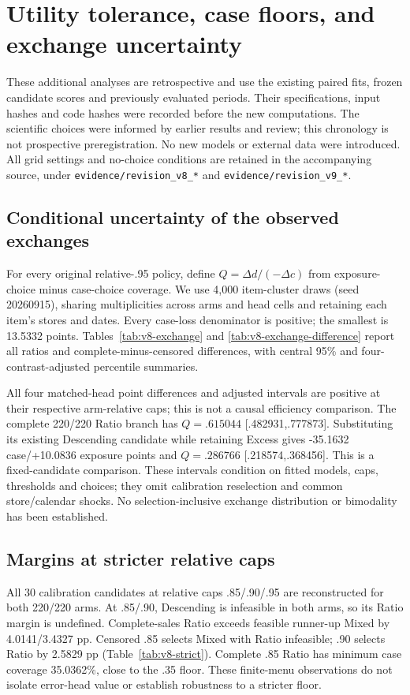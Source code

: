 \FloatBarrier
\section{Utility tolerance, case floors, and exchange uncertainty}
\label{app:v8}
These additional analyses are retrospective and use the existing paired fits, frozen candidate scores and previously evaluated periods. Their specifications, input hashes and code hashes were recorded before the new computations. The scientific choices were informed by earlier results and review; this chronology is not prospective preregistration. No new models or external data were introduced. All grid settings and no-choice conditions are retained in the accompanying source, under \texttt{evidence/revision\_v8\_*} and \texttt{evidence/revision\_v9\_*}.

\subsection{Conditional uncertainty of the observed exchanges}
\label{app:v8-exchange}
For every original relative-.95 policy, define $Q=\Delta d/(-\Delta c)$ from exposure-choice minus case-choice coverage. We use 4,000 item-cluster draws (seed 20260915), sharing multiplicities across arms and head cells and retaining each item's stores and dates. Every case-loss denominator is positive; the smallest is 13.5332 points. Tables~\ref{tab:v8-exchange} and \ref{tab:v8-exchange-difference} report all ratios and complete-minus-censored differences, with central 95\% and four-contrast-adjusted percentile summaries.


All four matched-head point differences and adjusted intervals are positive at their respective arm-relative caps; this is not a causal efficiency comparison. The complete 220/220 Ratio branch has $Q=.615044$ [.482931,.777873]. Substituting its existing Descending candidate while retaining Excess gives -35.1632 case/+10.0836 exposure points and $Q=.286766$ [.218574,.368456]. This is a fixed-candidate comparison. These intervals condition on fitted models, caps, thresholds and choices; they omit calibration reselection and common store/calendar shocks. No selection-inclusive exchange distribution or bimodality has been established.

\subsection{Margins at stricter relative caps}
\label{app:v8-strict}
All 30 calibration candidates at relative caps .85/.90/.95 are reconstructed for both 220/220 arms. At .85/.90, Descending is infeasible in both arms, so its Ratio margin is undefined. Complete-sales Ratio exceeds feasible runner-up Mixed by 4.0141/3.4327 pp. Censored .85 selects Mixed with Ratio infeasible; .90 selects Ratio by 2.5829 pp (Table~\ref{tab:v8-strict}). Complete .85 Ratio has minimum case coverage 35.0362\%, close to the .35 floor. These finite-menu observations do not isolate error-head value or establish robustness to a stricter floor.


